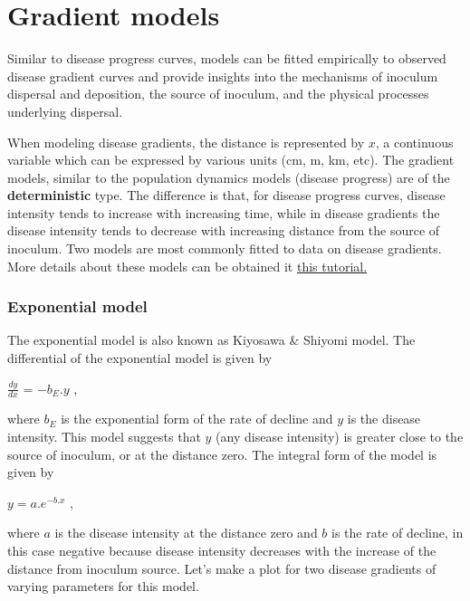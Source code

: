\documentclass[
  letterpaper,
  DIV=11,
  numbers=noendperiod]{scrreprt}
\begin{document}
\hypertarget{gradient-models}{%
\chapter{Gradient models}\label{gradient-models}}

Similar to disease progress curves, models can be fitted empirically to
observed disease gradient curves and provide insights into the
mechanisms of inoculum dispersal and deposition, the source of inoculum,
and the physical processes underlying dispersal.

When modeling disease gradients, the distance is represented by \(x\), a
continuous variable which can be expressed by various units (cm, m, km,
etc). The gradient models, similar to the population dynamics models
(disease progress) are of the \textbf{deterministic} type. The
difference is that, for disease progress curves, disease intensity tends
to increase with increasing time, while in disease gradients the disease
intensity tends to decrease with increasing distance from the source of
inoculum. Two models are most commonly fitted to data on disease
gradients. More details about these models can be obtained it
\href{https://www.apsnet.org/edcenter/disimpactmngmnt/topc/EcologyAndEpidemiologyInR/ModelingDispersalGradients/Pages/default.aspx}{this
tutorial.}

\hypertarget{exponential-model}{%
\subsection{Exponential model}\label{exponential-model}}

The exponential model is also known as Kiyosawa \& Shiyomi model. The
differential of the exponential model is given by

\(\frac{dy}{dx}\) = \(-b_{E}.y\) ,

where \(b_{E}\) is the exponential form of the rate of decline and \(y\)
is the disease intensity. This model suggests that \(y\) (any disease
intensity) is greater close to the source of inoculum, or at the
distance zero. The integral form of the model is given by

\(y = a . e^{-b.x}\) ,

where \(a\) is the disease intensity at the distance zero and \(b\) is
the rate of decline, in this case negative because disease intensity
decreases with the increase of the distance from inoculum source. Let's
make a plot for two disease gradients of varying parameters for this
model.
\end{document}
